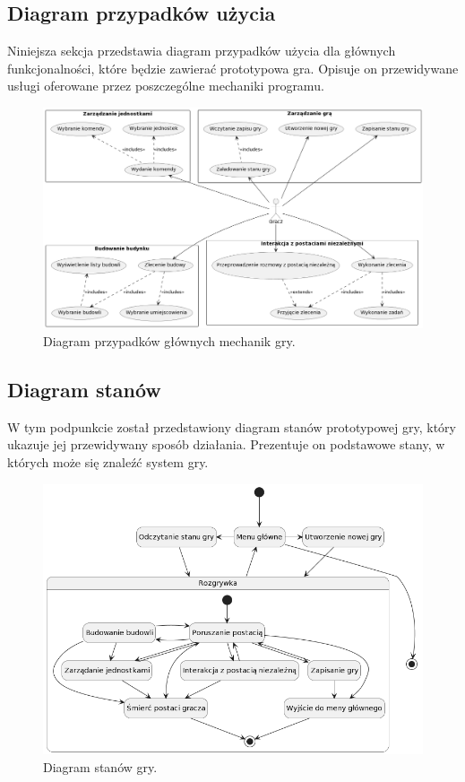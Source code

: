 \subsection{Diagram przypadków użycia}\label{ss:usecase}
Niniejsza sekcja przedstawia diagram przypadków użycia dla głównych funkcjonalności, które będzie zawierać prototypowa gra.
Opisuje on przewidywane usługi oferowane przez poszczególne mechaniki programu.
\begin{figure}[!htbp]
    \centering
    \includegraphics[width=textwidth]{images/diagrams/usecase.png}
    \caption{Diagram przypadków głównych mechanik gry.}\label{fig:usecases}
\end{figure}
\FloatBarrier

\subsection{Diagram stanów}\label{ss:state}
W tym podpunkcie został przedstawiony diagram stanów prototypowej gry, który ukazuje jej przewidywany sposób działania.
Prezentuje on podstawowe stany, w których może się znaleźć system gry.
\begin{figure}[!htbp]
    \centering
    \includegraphics[width=textwidth]{images/diagrams/state.png}
    \caption{Diagram stanów gry.}\label{fig:states}
\end{figure}
\FloatBarrier

